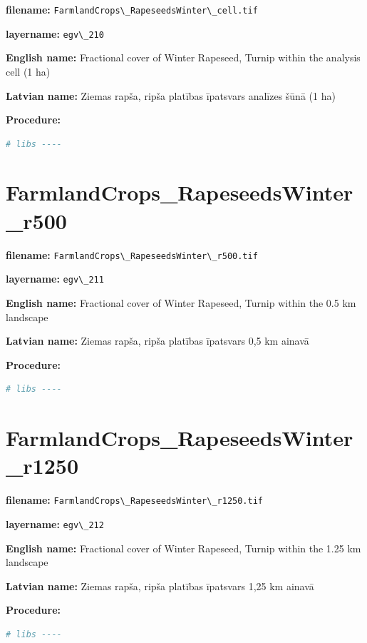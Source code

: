 \documentclass[
]{book}
\newcommand{\passthrough}[1]{#1}
\begin{document}
\textbf{filename:} \passthrough{\lstinline!FarmlandCrops\_RapeseedsWinter\_cell.tif!}

\textbf{layername:} \passthrough{\lstinline!egv\_210!}

\textbf{English name:} Fractional cover of Winter Rapeseed, Turnip within the analysis cell (1 ha)

\textbf{Latvian name:} Ziemas rapša, ripša platības īpatsvars analīzes šūnā (1 ha)

\textbf{Procedure:}

\begin{lstlisting}[language=R]
# libs ----
\end{lstlisting}

\section{FarmlandCrops\_RapeseedsWinter\_r500}\label{ch06.211}

\textbf{filename:} \passthrough{\lstinline!FarmlandCrops\_RapeseedsWinter\_r500.tif!}

\textbf{layername:} \passthrough{\lstinline!egv\_211!}

\textbf{English name:} Fractional cover of Winter Rapeseed, Turnip within the 0.5 km landscape

\textbf{Latvian name:} Ziemas rapša, ripša platības īpatsvars 0,5 km ainavā

\textbf{Procedure:}

\begin{lstlisting}[language=R]
# libs ----
\end{lstlisting}

\section{FarmlandCrops\_RapeseedsWinter\_r1250}\label{ch06.212}

\textbf{filename:} \passthrough{\lstinline!FarmlandCrops\_RapeseedsWinter\_r1250.tif!}

\textbf{layername:} \passthrough{\lstinline!egv\_212!}

\textbf{English name:} Fractional cover of Winter Rapeseed, Turnip within the 1.25 km landscape

\textbf{Latvian name:} Ziemas rapša, ripša platības īpatsvars 1,25 km ainavā

\textbf{Procedure:}

\begin{lstlisting}[language=R]
# libs ----
\end{lstlisting}
\end{document}
